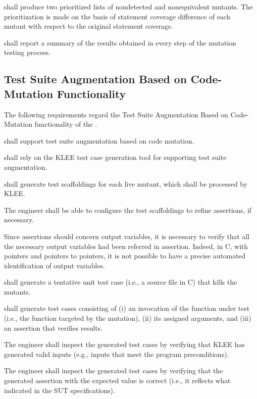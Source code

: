 \RQ{} \FAQAS shall produce two prioritized lists of nondetected and nonequivalent mutants. The prioritization is made on the basis of statement coverage difference of each mutant with respect to the original statement coverage.

\RQ{} \FAQAS shall report a summary of the results obtained in every step of the mutation testing process.



\subsection{Test Suite Augmentation Based on Code-Mutation Functionality}
\label{sec:codeDrivenAugmentation}

The following requirements regard the Test Suite Augmentation Based on Code-Mutation functionality of the \FAQAS.

\RQ{} \FAQAS shall support test suite augmentation based on code mutation.

\RQ{} \FAQAS shall rely on the KLEE test case generation tool for supporting test suite augmentation.

\RQ{} \FAQAS shall generate test scaffoldings for each live mutant, which shall be processed by KLEE.

\RQ{} The engineer shall be able to configure the test scaffoldings to refine assertions, if necessary.

\remark Since assertions should concern output variables, it is necessary to verify that all the necessary output variables had been referred in assertion. Indeed, in C, with pointers and pointers to pointers, it is not possible to have a precise automated identification of output variables.

\RQ{} \FAQAS shall generate a tentative unit test case (i.e., a source file in C) that kills the mutants.

\RQ{} \FAQAS shall generate test cases consisting of (i) an invocation of the function under test (i.e., the function targeted by the mutation), (ii) its assigned arguments, and (iii) an assertion that verifies results.

\RQ{} The engineer shall inspect the generated test cases by verifying that KLEE has generated valid inputs (e.g., inputs that meet the program preconditions).

\RQ{} The engineer shall inspect the generated test cases by verifying that the generated assertion with the expected value is correct (i.e., it reflects what indicated in the SUT specifications). 

